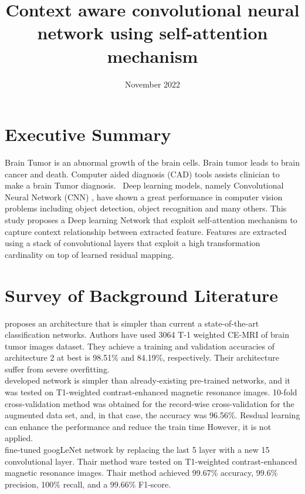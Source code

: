 \documentclass{article}
\title{Context aware convolutional neural network using self-attention mechanism }
\date{November 2022}
\begin{document}
\maketitle


\section{Executive Summary}

Brain Tumor is an abnormal growth of the brain cells\cite{deangelis2001brain}. Brain tumor leads to brain cancer and death\cite{deangelis2001brain}. Computer aided diagnosis (CAD) tools assists clinician to make a brain Tumor diagnosis.
~Deep learning \cite{lecun2015deep} models, namely Convolutional Neural Network (CNN) \cite{lecun1989handwritten}, have shown a great performance in computer vision problems including object detection\cite{erhan2014scalable}\cite{girshick2014rich}\cite{sermanet2013overfeat}\cite{redmon2016you}, object recognition\cite{simonyan2014very}\cite{he2016deep} and many others.
This study proposes a Deep learning Network that exploit self-attention mechanism \cite{vaswani2017attention} to capture context relationship between extracted feature. Features are extracted using a stack of convolutional layers that exploit a high transformation cardinality\cite{xie2017aggregated} on top of learned residual mapping\cite{he2016deep}.


\section{Survey of Background Literature}

\cite{abiwinanda2019brain} proposes an architecture that is simpler than current a state-of-the-art classification networks. Authors have used 3064 T-1 weighted
CE-MRI of brain tumor images dataset\cite{cheng2017brain}. They achieve a training
and validation accuracies of architecture 2 at best is 98.51\% and 84.19\%, respectively. Their architecture suffer from severe overfitting.\\
\cite{badvza2020classification} developed network is simpler than already-existing pre-trained networks, and it was tested on T1-weighted contrast-enhanced magnetic resonance images\cite{cheng2017brain}.  10-fold cross-validation method was obtained for the record-wise cross-validation for the augmented data set, and, in that case, the accuracy was 96.56\%. Resdual learning\cite{he2016deep} can enhance the performance and reduce the train time However, it is not applied.\\
\cite{raza2022hybrid} fine-tuned googLeNet\cite{szegedy2015going} network by replacing the last 5 layer with a new 15 convolutional layer. Thair method ware tested on T1-weighted contrast-enhanced magnetic resonance images\cite{cheng2017brain}. Thair method achieved  99.67\% accuracy, 99.6\% precision, 100\% recall, and a 99.66\% F1-score. 
\end{document}
